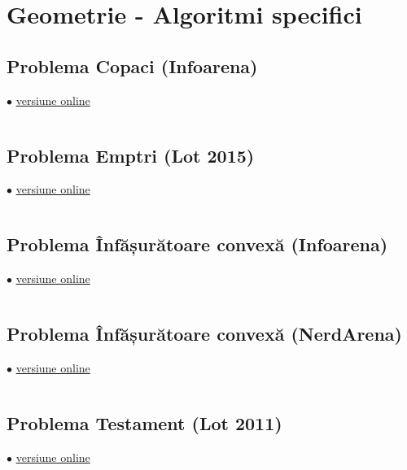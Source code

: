 \documentclass[../main.tex]{subfiles}
\begin{document}
\chapter{Geometrie - Algoritmi specifici}

\section{Problema Copaci (Infoarena)}
\label{code:copaci}
$\bullet$
\href{https://infoarena.ro/job_detail/3216583?action=view-source}{versiune online}

\inputminted{cpp}{../src/geometry/copaci.cpp}

\section{Problema Emptri (Lot 2015)}
\label{code:emptri}
$\bullet$
\href{https://kilonova.ro/submissions/965622}{versiune online}

\inputminted{cpp}{../src/geometry/emptri.cpp}

\section{Problema Înfășurătoare convexă (Infoarena)}
\label{code:infasuratoare-convexa-1}
$\bullet$
\href{https://www.infoarena.ro/job_detail/3216628?action=view-source}{versiune online}

\inputminted{cpp}{../src/geometry/infasuratoare-convexa-1.cpp}

\section{Problema Înfășurătoare convexă (NerdArena)}
\label{code:infasuratoare-convexa-2}
$\bullet$
\href{https://www.nerdarena.ro/job_detail/817952?action=view-source}{versiune online}

\inputminted{cpp}{../src/geometry/infasuratoare-convexa-2.cpp}

\section{Problema Testament (Lot 2011)}
\label{code:testament}
$\bullet$
\href{https://kilonova.ro/submissions/1158973}{versiune online}

\inputminted{cpp}{../src/geometry/testament.cpp}
\end{document}
